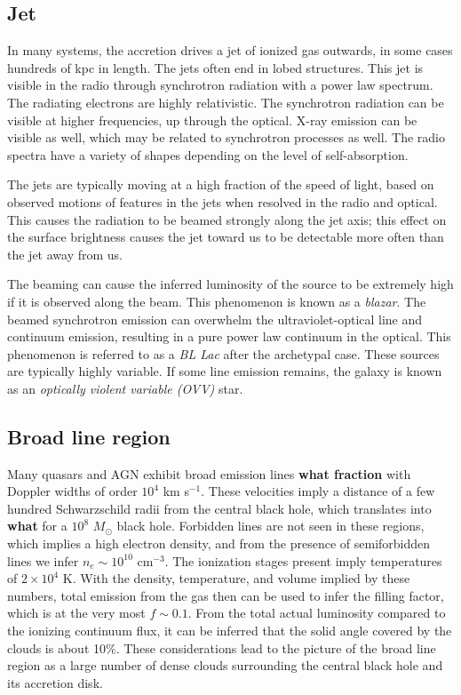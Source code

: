 \subsection{Jet}

In many systems, the accretion drives a jet of ionized gas outwards,
in some cases hundreds of kpc in length.  The jets often end in lobed
structures.  This jet is visible in the radio through synchrotron
radiation with a power law spectrum. The radiating electrons are
highly relativistic. The synchrotron radiation can be visible at
higher frequencies, up through the optical. X-ray emission can be
visible as well, which may be related to synchrotron processes as
well. The radio spectra have a variety of shapes depending on the
level of self-absorption.

The jets are typically moving at a high fraction of the speed of
light, based on observed motions of features in the jets when resolved
in the radio and optical. This causes the radiation to be beamed
strongly along the jet axis; this effect on the surface brightness
causes the jet toward us to be detectable more often than the jet away
from us.

The beaming can cause the inferred luminosity of the source to be
extremely high if it is observed along the beam. This phenomenon is
known as a {\it blazar}. The beamed synchrotron emission can overwhelm
the ultraviolet-optical line and continuum emission, resulting in a
pure power law continuum in the optical. This phenomenon is referred
to as a {\it BL Lac} after the archetypal case. These sources are
typically highly variable. If some line emission remains, the galaxy
is known as an {\it optically violent variable (OVV)} star.

\subsection{Broad line region}

Many quasars and AGN exhibit broad emission lines {\bf what fraction}
with Doppler widths of order $10^4$ km s$^{-1}$. These velocities
imply a distance of a few hundred Schwarzschild radii from the central
black hole, which translates into {\bf what} for a $10^8$ $M_\odot$
black hole. Forbidden lines are not seen in these regions, which
implies a high electron density, and from the presence of
semiforbidden lines we infer $n_e \sim 10^{10}$ cm$^{-3}$. The
ionization stages present imply temperatures of $2\times 10^4$ K. With
the density, temperature, and volume implied by these numbers, total
emission from the gas then can be used to infer the filling factor,
which is at the very most $f\sim 0.1$. From the total actual
luminosity compared to the ionizing continuum flux, it can be inferred
that the solid angle covered by the clouds is about 10\%. These
considerations lead to the picture of the broad line region as a large
number of dense clouds surrounding the central black hole and its
accretion disk.

